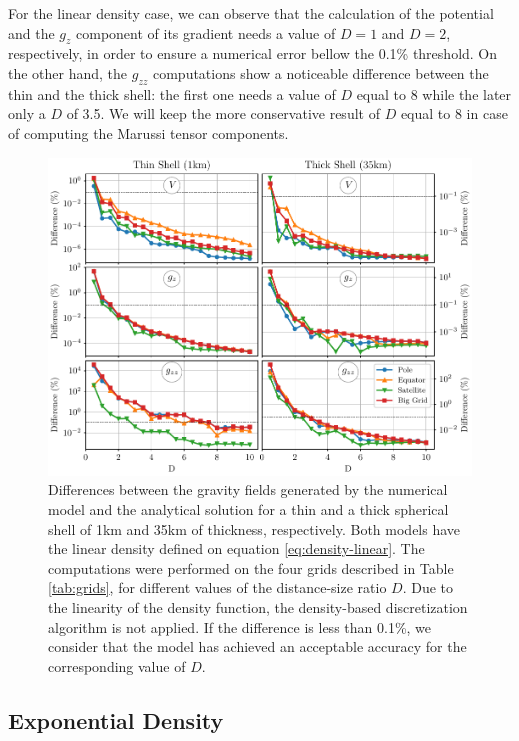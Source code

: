 \documentclass[extra]{gji}
\begin{document}
For the linear density case, we can observe that the calculation of the
potential and the $g_z$ component of its gradient needs a value of
$D=1$ and $D=2$, respectively, in order to ensure a numerical error
bellow the 0.1\% threshold.
On the other hand, the $g_{zz}$ computations show a noticeable
difference between the thin and the thick shell: the first one needs a
value of $D$ equal to 8 while the later only a $D$ of 3.5.
We will keep the more conservative result of $D$ equal to 8 in case of
computing the Marussi tensor components.

\begin{figure}
\centering
\includegraphics[width=\linewidth]{figures/linear-D.pdf}
\caption{
    Differences between the gravity fields generated by the numerical model
    and the analytical solution for a thin and a thick spherical shell of 1km
    and 35km of thickness, respectively.
    Both models have the linear density defined on equation
    \ref{eq:density-linear}.
    The computations were performed on the four grids described in
    Table \ref{tab:grids}, for different values of the distance-size
    ratio $D$.
    Due to the linearity of the density function, the density-based
    discretization algorithm is not applied.
    If the difference is less than 0.1\%, we consider that the model
    has achieved an acceptable accuracy for the corresponding value of
    $D$.
    }
\label{fig:D-linear}
\end{figure}


\subsection{Exponential Density}
\end{document}
